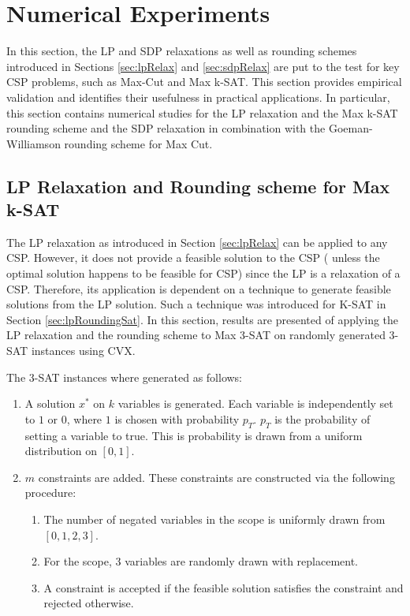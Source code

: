 \section{Numerical Experiments}
In this section, the LP and SDP relaxations as well as rounding schemes introduced in Sections \ref{sec:lpRelax} and \ref{sec:sdpRelax} are put to the test for key CSP problems, such as Max-Cut and Max k-SAT. This section provides empirical validation and identifies their usefulness in practical applications. In particular, this section contains numerical studies for the LP relaxation and the Max k-SAT rounding scheme and the SDP relaxation in combination with the Goeman-Williamson rounding scheme for Max Cut. 

\subsection{LP Relaxation and Rounding scheme for Max k-SAT}
The LP relaxation as introduced in Section \ref{sec:lpRelax} can be applied to any CSP. However, it does not provide a feasible solution to the CSP ( unless the optimal solution happens to be feasible for CSP) since the LP is a relaxation of a CSP. Therefore, its application is dependent on a technique to generate feasible solutions from the LP solution. Such a technique was introduced for K-SAT in Section \ref{sec:lpRoundingSat}. In this section, results are presented of applying the LP relaxation and the rounding scheme to Max 3-SAT on randomly generated 3-SAT instances using CVX.

The 3-SAT instances where generated as follows:
\begin{enumerate}
	\item A solution $x^*$ on $k$ variables is generated. Each variable is independently set to $1$ or $0$, where $1$ is chosen with probability $p_T$. $p_T$ is the probability of setting a variable to true. This is probability is drawn from a uniform distribution on $[0,1]$. 
	\item $m$ constraints are added. These constraints are constructed via the following procedure:
	\begin{enumerate}
		\item The number of negated variables in the scope is uniformly drawn from $[0,1,2,3]$.
		\item For the scope, 3 variables are randomly drawn with replacement.
		\item A constraint is accepted if the feasible solution satisfies the constraint and rejected otherwise.
	\end{enumerate}
\end{enumerate}

